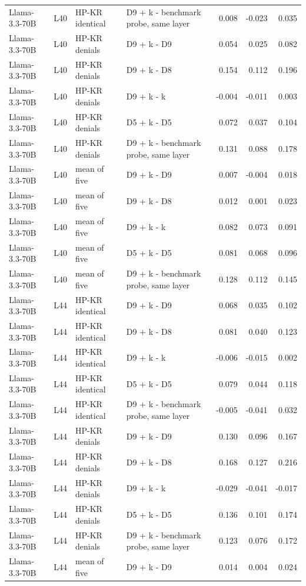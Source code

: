 \begin{table}
\begin{tabular}{llllrrr}
Llama-3.3-70B & L40 & HP-KR identical & D9 + k - benchmark probe, same layer & 0.008 & -0.023 & 0.035 \\
Llama-3.3-70B & L40 & HP-KR denials & D9 + k - D9 & 0.054 & 0.025 & 0.082 \\
Llama-3.3-70B & L40 & HP-KR denials & D9 + k - D8 & 0.154 & 0.112 & 0.196 \\
Llama-3.3-70B & L40 & HP-KR denials & D9 + k - k & -0.004 & -0.011 & 0.003 \\
Llama-3.3-70B & L40 & HP-KR denials & D5 + k - D5 & 0.072 & 0.037 & 0.104 \\
Llama-3.3-70B & L40 & HP-KR denials & D9 + k - benchmark probe, same layer & 0.131 & 0.088 & 0.178 \\
Llama-3.3-70B & L40 & mean of five & D9 + k - D9 & 0.007 & -0.004 & 0.018 \\
Llama-3.3-70B & L40 & mean of five & D9 + k - D8 & 0.012 & 0.001 & 0.023 \\
Llama-3.3-70B & L40 & mean of five & D9 + k - k & 0.082 & 0.073 & 0.091 \\
Llama-3.3-70B & L40 & mean of five & D5 + k - D5 & 0.081 & 0.068 & 0.096 \\
Llama-3.3-70B & L40 & mean of five & D9 + k - benchmark probe, same layer & 0.128 & 0.112 & 0.145 \\
Llama-3.3-70B & L44 & HP-KR identical & D9 + k - D9 & 0.068 & 0.035 & 0.102 \\
Llama-3.3-70B & L44 & HP-KR identical & D9 + k - D8 & 0.081 & 0.040 & 0.123 \\
Llama-3.3-70B & L44 & HP-KR identical & D9 + k - k & -0.006 & -0.015 & 0.002 \\
Llama-3.3-70B & L44 & HP-KR identical & D5 + k - D5 & 0.079 & 0.044 & 0.118 \\
Llama-3.3-70B & L44 & HP-KR identical & D9 + k - benchmark probe, same layer & -0.005 & -0.041 & 0.032 \\
Llama-3.3-70B & L44 & HP-KR denials & D9 + k - D9 & 0.130 & 0.096 & 0.167 \\
Llama-3.3-70B & L44 & HP-KR denials & D9 + k - D8 & 0.168 & 0.127 & 0.216 \\
Llama-3.3-70B & L44 & HP-KR denials & D9 + k - k & -0.029 & -0.041 & -0.017 \\
Llama-3.3-70B & L44 & HP-KR denials & D5 + k - D5 & 0.136 & 0.101 & 0.174 \\
Llama-3.3-70B & L44 & HP-KR denials & D9 + k - benchmark probe, same layer & 0.123 & 0.076 & 0.172 \\
Llama-3.3-70B & L44 & mean of five & D9 + k - D9 & 0.014 & 0.004 & 0.024 \\

\end{tabular}
\end{table}
